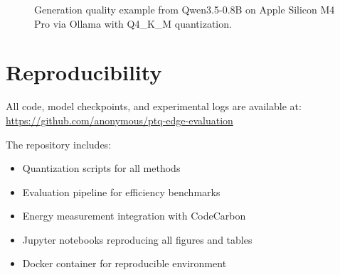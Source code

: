 \documentclass[11pt,a4paper]{article}
\begin{document}
\begin{figure}[h]
\centering
{}
\caption{Generation quality example from Qwen3.5-0.8B on Apple Silicon M4 Pro via Ollama with Q4\_K\_M quantization.}
\label{fig:examples}
\end{figure}

\section{Reproducibility}

All code, model checkpoints, and experimental logs are available at: \url{https://github.com/anonymous/ptq-edge-evaluation}

The repository includes:
\begin{itemize}[leftmargin=*,nosep]
    \item Quantization scripts for all methods
    \item Evaluation pipeline for efficiency benchmarks
    \item Energy measurement integration with CodeCarbon
    \item Jupyter notebooks reproducing all figures and tables
    \item Docker container for reproducible environment
\end{itemize}
\end{document}
